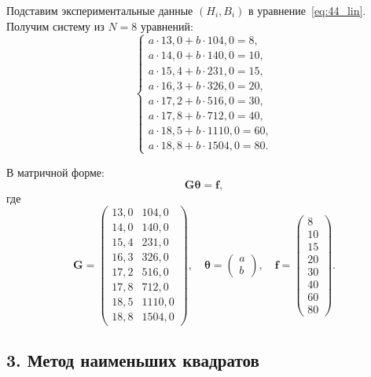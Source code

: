 \documentclass{article}
\begin{document}
Подставим экспериментальные данные $(H_i, B_i)$ в уравнение~\eqref{eq:44_lin}. Получим систему из $N = 8$ уравнений:
\begin{equation}
\begin{cases}
a \cdot 13{,}0 + b \cdot 104{,}0 = 8, \\
a \cdot 14{,}0 + b \cdot 140{,}0 = 10, \\
a \cdot 15{,}4 + b \cdot 231{,}0 = 15, \\
a \cdot 16{,}3 + b \cdot 326{,}0 = 20, \\
a \cdot 17{,}2 + b \cdot 516{,}0 = 30, \\
a \cdot 17{,}8 + b \cdot 712{,}0 = 40, \\
a \cdot 18{,}5 + b \cdot 1110{,}0 = 60, \\
a \cdot 18{,}8 + b \cdot 1504{,}0 = 80.
\end{cases}
\end{equation}

В матричной форме:
\begin{equation}
\mathbf{G} \boldsymbol{\theta} = \mathbf{f},
\label{eq:44_slau}
\end{equation}
где
\begin{equation}
\mathbf{G} =
\begin{pmatrix}
13{,}0 & 104{,}0 \\
14{,}0 & 140{,}0 \\
15{,}4 & 231{,}0 \\
16{,}3 & 326{,}0 \\
17{,}2 & 516{,}0 \\
17{,}8 & 712{,}0 \\
18{,}5 & 1110{,}0 \\
18{,}8 & 1504{,}0
\end{pmatrix}, \quad
\boldsymbol{\theta} =
\begin{pmatrix}
a \\ b
\end{pmatrix}, \quad
\mathbf{f} =
\begin{pmatrix}
8 \\ 10 \\ 15 \\ 20 \\ 30 \\ 40 \\ 60 \\ 80
\end{pmatrix}.
\end{equation}

\subsection*{3. Метод наименьших квадратов}
\end{document}
